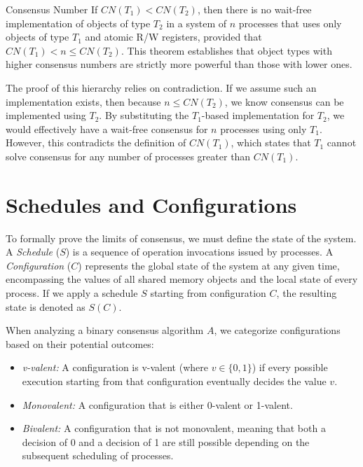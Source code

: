 \begin{Thm}{Consensus Number}{}
If $CN(T_1)<CN(T_2)$, then there is no wait-free implementation of objects of type $T_2$ in a system of $n$ processes that uses only objects of type $T_1$ and atomic R/W registers, provided that $CN(T_1)<n\leq CN(T_2)$. This theorem establishes that object types with higher consensus numbers are strictly more powerful than those with lower ones.
\begin{demonstration}
The proof of this hierarchy relies on contradiction. If we assume such an implementation exists, then because $n\leq CN(T_2)$, we know consensus can be implemented using $T_2$. By substituting the $T_1$-based implementation for $T_2$, we would effectively have a wait-free consensus for $n$ processes using only $T_1$. However, this contradicts the definition of $CN(T_1)$, which states that $T_1$ cannot solve consensus for any number of processes greater than $CN(T_1)$.
\end{demonstration}
\end{Thm}

\section{Schedules and Configurations}
To formally prove the limits of consensus, we must define the state of the system. A \textit{Schedule} ($S$) is a sequence of operation invocations issued by processes. A \textit{Configuration} ($C$) represents the global state of the system at any given time, encompassing the values of all shared memory objects and the local state of every process. If we apply a schedule $S$ starting from configuration $C$, the resulting state is denoted as $S(C)$.

When analyzing a binary consensus algorithm $A$, we categorize configurations based on their potential outcomes:
\begin{itemize}
    \item  \textit{v-valent:} A configuration is v-valent (where $v\in \{0,1\}$) if every possible execution starting from that configuration eventually decides the value $v$.
    \item \textit{Monovalent:} A configuration that is either 0-valent or 1-valent.
    \item \textit{Bivalent:} A configuration that is not monovalent, meaning that both a decision of 0 and a decision of 1 are still possible depending on the subsequent scheduling of processes.
\end{itemize}

